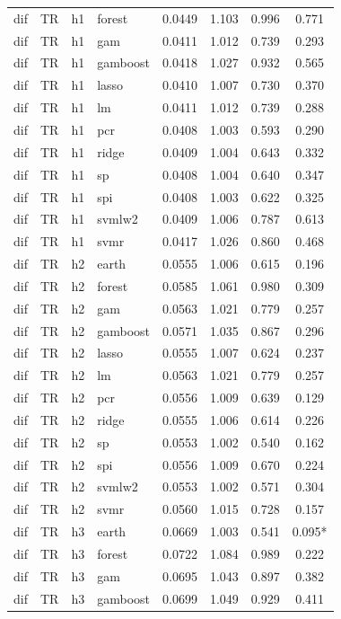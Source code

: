 \begin{ThreePartTable}
\begin{longtable}[t]{llclcccc}
dif & TR & h1 & forest & 0.0449 & 1.103 & 0.996 & 0.771\\
dif & TR & h1 & gam & 0.0411 & 1.012 & 0.739 & 0.293\\
dif & TR & h1 & gamboost & 0.0418 & 1.027 & 0.932 & 0.565\\
dif & TR & h1 & lasso & 0.0410 & 1.007 & 0.730 & 0.370\\
dif & TR & h1 & lm & 0.0411 & 1.012 & 0.739 & 0.288\\
dif & TR & h1 & pcr & 0.0408 & 1.003 & 0.593 & 0.290\\
dif & TR & h1 & ridge & 0.0409 & 1.004 & 0.643 & 0.332\\
dif & TR & h1 & sp & 0.0408 & 1.004 & 0.640 & 0.347\\
dif & TR & h1 & spi & 0.0408 & 1.003 & 0.622 & 0.325\\
dif & TR & h1 & svmlw2 & 0.0409 & 1.006 & 0.787 & 0.613\\
dif & TR & h1 & svmr & 0.0417 & 1.026 & 0.860 & 0.468\\
\addlinespace
dif & TR & h2 & earth & 0.0555 & 1.006 & 0.615 & 0.196\\
dif & TR & h2 & forest & 0.0585 & 1.061 & 0.980 & 0.309\\
dif & TR & h2 & gam & 0.0563 & 1.021 & 0.779 & 0.257\\
dif & TR & h2 & gamboost & 0.0571 & 1.035 & 0.867 & 0.296\\
dif & TR & h2 & lasso & 0.0555 & 1.007 & 0.624 & 0.237\\
dif & TR & h2 & lm & 0.0563 & 1.021 & 0.779 & 0.257\\
dif & TR & h2 & pcr & 0.0556 & 1.009 & 0.639 & 0.129\\
dif & TR & h2 & ridge & 0.0555 & 1.006 & 0.614 & 0.226\\
dif & TR & h2 & sp & 0.0553 & 1.002 & 0.540 & 0.162\\
dif & TR & h2 & spi & 0.0556 & 1.009 & 0.670 & 0.224\\
dif & TR & h2 & svmlw2 & 0.0553 & 1.002 & 0.571 & 0.304\\
dif & TR & h2 & svmr & 0.0560 & 1.015 & 0.728 & 0.157\\
\addlinespace
dif & TR & h3 & earth & 0.0669 & 1.003 & 0.541 & 0.095*\\
dif & TR & h3 & forest & 0.0722 & 1.084 & 0.989 & 0.222\\
dif & TR & h3 & gam & 0.0695 & 1.043 & 0.897 & 0.382\\
dif & TR & h3 & gamboost & 0.0699 & 1.049 & 0.929 & 0.411\\

\end{longtable}
\end{ThreePartTable}
